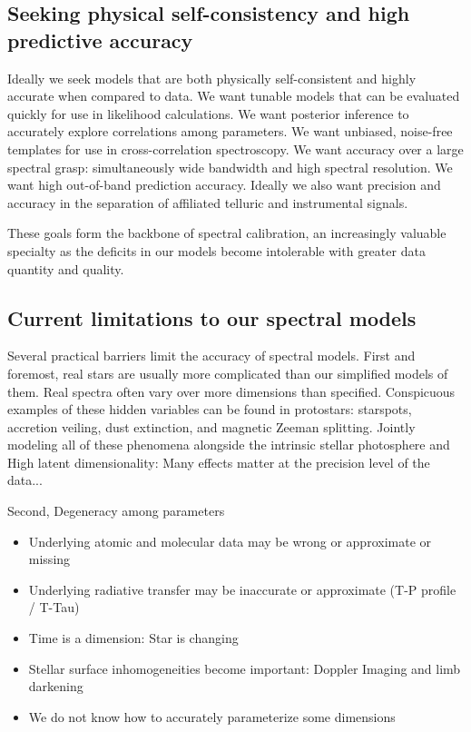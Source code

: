 \documentclass[modern]{aastex631}
\begin{document}
\subsection{Seeking physical self-consistency and high predictive accuracy}
Ideally we seek models that are both physically self-consistent and highly accurate when compared to data.  We want tunable models that can be evaluated quickly for use in likelihood calculations.  We want posterior inference to accurately explore correlations among parameters.  We want unbiased, noise-free templates for use in cross-correlation spectroscopy.  We want accuracy over a large spectral grasp: simultaneously wide bandwidth and high spectral resolution.  We want high out-of-band prediction accuracy.  Ideally we also want precision and accuracy in the separation of affiliated telluric and instrumental signals.

These goals form the backbone of spectral calibration, an increasingly valuable specialty as the deficits in our models become intolerable with greater data quantity and quality.

\subsection{Current limitations to our spectral models}

Several practical barriers limit the accuracy of spectral models.  First and foremost, real stars are usually more complicated than our simplified models of them.  Real spectra often vary over more dimensions than specified.  Conspicuous examples of these hidden variables can be found in protostars: starspots, accretion veiling, dust extinction, and magnetic Zeeman splitting.  Jointly modeling all of these phenomena alongside the intrinsic stellar photosphere and  High latent dimensionality: Many effects matter at the precision level of the data...

Second, Degeneracy among parameters

\begin{itemize}
  \item Underlying atomic and molecular data may be wrong or approximate or missing
  \item Underlying radiative transfer may be inaccurate or approximate (T-P profile / T-Tau)
  \item Time is a dimension: Star is changing
  \item Stellar surface inhomogeneities become important: Doppler Imaging and limb darkening
  \item We do not know how to accurately parameterize some dimensions
\end{itemize}
\end{document}
